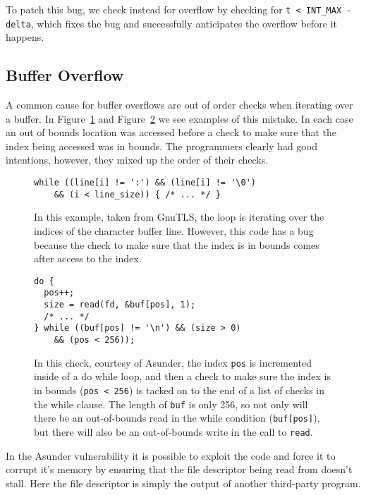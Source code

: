 \documentclass[10pt,twocolumn]{article}
\begin{document}
To patch this bug, we check instead for overflow by checking for \texttt{t <
INT\_MAX - delta}, which fixes the bug and successfully anticipates the
overflow before it happens.

\subsection{Buffer Overflow}
A common cause for buffer overflows are out of order checks when iterating over
a buffer. In Figure~\ref{fig:gnutls-bad-check} and
Figure~\ref{fig:asunder-bad-check} we see examples of this mistake. In each case
an out of bounds location was accessed before a check to make sure that the
index being accessed was in bounds. The programmers clearly had good
intentions, however, they mixed up the order of their checks.

\begin{figure}[t]
\begin{lstlisting}
while ((line[i] != ':') && (line[i] != '\0')
    && (i < line_size)) { /* ... */ }
\end{lstlisting}
\caption{\label{fig:gnutls-bad-check} In this example, taken from GnuTLS, the
loop is iterating over the indices of the character buffer line. However, this
code has a bug because the check to make sure that the index is in bounds comes
after access to the index.}
\end{figure}

\begin{figure}[t]
\begin{lstlisting}
do {
  pos++;
  size = read(fd, &buf[pos], 1);
  /* ... */
} while ((buf[pos] != '\n') && (size > 0)
    && (pos < 256));
\end{lstlisting}
\caption{\label{fig:asunder-bad-check} In this check, courtesy of Asunder, the
index \texttt{pos} is incremented inside of a do while loop, and then a check
to make sure the index is in bounds (\texttt{pos < 256}) is tacked on to the
end of a list of checks in the while clause. The length of \texttt{buf} is only
256, so not only will there be an out-of-bounds read in the while condition
(\texttt{buf[pos]}), but there will also be an out-of-bounds write in the call
to \texttt{read}.}
\end{figure}

In the Asunder vulnerability it is possible to exploit the code and force it to
corrupt it's memory by ensuring that the file descriptor being read from
doesn't stall. Here the file descriptor is simply the output of another
third-party program.
\end{document}

